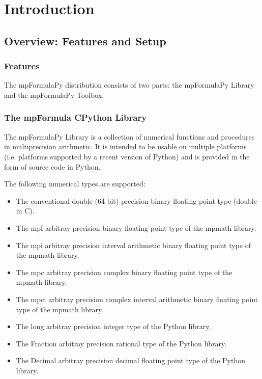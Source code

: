 \chapter{Introduction}
\label{Introduction1} 


\section{Overview: Features and Setup}

\subsection{Features}
The mpFormulaPy distribution consists of two parts: the mpFormulaPy Library and the mpFormulaPy Toolbox.

\subsection{The mpFormula CPython Library}
The mpFormulaPy Library is a collection of numerical functions and procedures in multiprecision arithmetic. It is intended to be usable on multiple platforms (i.e. platforms supported by a recent version of Python) and is provided in the form of source code in Python. 

The following numerical types are supported:

\begin{itemize}		
  \item The conventional double (64 bit) precision binary floating point type (double in C).
  \item The mpf arbitray precision binary floating point type of the mpmath library.
  \item The mpi arbitray precision interval arithmetic binary floating point type of the mpmath library.
  \item The mpc arbitray precision complex binary floating point type of the mpmath library. 
  \item The mpci arbitray precision complex interval arithmetic binary floating point type of the mpmath library.
  \item The long arbitray precision integer type of the Python library. 
  \item The Fraction arbitray precision rational type of the Python library. 
  \item The Decimal arbitray precision decimal floating point type of the Python library. 
\end{itemize}

